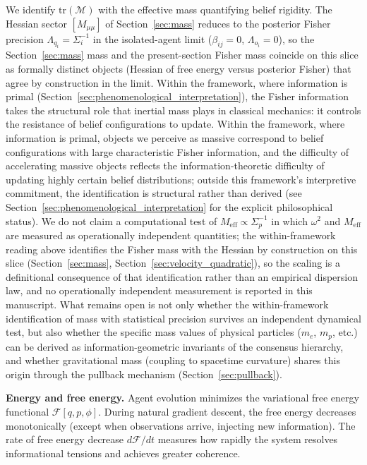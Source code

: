 \documentclass[11pt]{article}
\begin{document}
We identify $\mathrm{tr}(\mathcal{M})$ with the effective mass quantifying belief rigidity. The Hessian sector $[M_{\mu\mu}]$ of Section~\ref{sec:mass} reduces to the posterior Fisher precision $\Lambda_{q_i} = \Sigma_i^{-1}$ in the isolated-agent limit ($\beta_{ij} = 0$, $\Lambda_{o_i} = 0$), so the Section~\ref{sec:mass} mass and the present-section Fisher mass coincide on this slice as formally distinct objects (Hessian of free energy versus posterior Fisher) that agree by construction in the limit. Within the framework, where information is primal (Section~\ref{sec:phenomenological_interpretation}), the Fisher information takes the structural role that inertial mass plays in classical mechanics: it controls the resistance of belief configurations to update. Within the framework, where information is primal, objects we perceive as massive correspond to belief configurations with large characteristic Fisher information, and the difficulty of accelerating massive objects reflects the information-theoretic difficulty of updating highly certain belief distributions; outside this framework's interpretive commitment, the identification is structural rather than derived (see Section~\ref{sec:phenomenological_interpretation} for the explicit philosophical status). We do not claim a computational test of $M_{\mathrm{eff}} \propto \Sigma_p^{-1}$ in which $\omega^2$ and $M_{\mathrm{eff}}$ are measured as operationally independent quantities; the within-framework reading above identifies the Fisher mass with the Hessian by construction on this slice (Section~\ref{sec:mass}, Section~\ref{sec:velocity_quadratic}), so the scaling is a definitional consequence of that identification rather than an empirical dispersion law, and no operationally independent measurement is reported in this manuscript. What remains open is not only whether the within-framework identification of mass with statistical precision survives an independent dynamical test, but also whether the specific mass values of physical particles ($m_e$, $m_p$, etc.) can be derived as information-geometric invariants of the consensus hierarchy, and whether gravitational mass (coupling to spacetime curvature) shares this origin through the pullback mechanism (Section~\ref{sec:pullback}).

\textbf{Energy and free energy.} Agent evolution minimizes the variational free energy functional $\mathcal{F}[q, p, \phi]$. During natural gradient descent, the free energy decreases monotonically (except when observations arrive, injecting new information). The rate of free energy decrease $d\mathcal{F}/dt$ measures how rapidly the system resolves informational tensions and achieves greater coherence.
\end{document}
